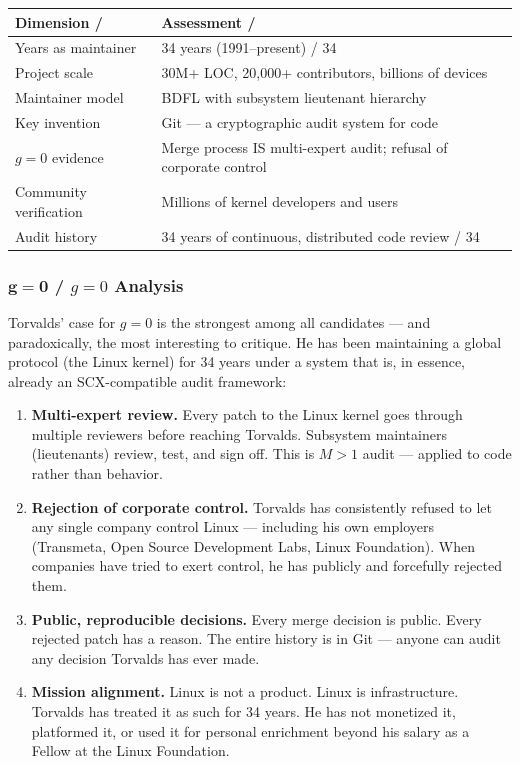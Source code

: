 \documentclass[12pt,a4paper]{article}
\theoremstyle{remark}
\begin{document}
\begin{center}
\begin{tabular}{p{} p{}}
\toprule
\textbf{Dimension / } & \textbf{Assessment / } \\
\midrule
Years as maintainer & 34 years (1991–present) / 34 \\
Project scale & 30M+ LOC, 20,000+ contributors, billions of devices \\
Maintainer model & BDFL with subsystem lieutenant hierarchy \\
Key invention & Git — a cryptographic audit system for code \\
$g=0$ evidence & Merge process IS multi-expert audit; refusal of corporate control \\
Community verification & Millions of kernel developers and users \\
Audit history & 34 years of continuous, distributed code review / 34 \\
\bottomrule
\end{tabular}
\end{center}

\subsubsection{$\mathbf{g=0}$  / $g=0$ Analysis}

Torvalds' case for $g=0$ is the strongest among all candidates — and
paradoxically, the most interesting to critique. He has been maintaining a
global protocol (the Linux kernel) for 34 years under a system that is, in
essence, already an SCX-compatible audit framework:

\begin{enumerate}[leftmargin=*]
    \item \textbf{Multi-expert review.} Every patch to the Linux kernel goes
          through multiple reviewers before reaching Torvalds. Subsystem
          maintainers (lieutenants) review, test, and sign off. This is
          $M > 1$ audit — applied to code rather than behavior.

    \item \textbf{Rejection of corporate control.} Torvalds has consistently
          refused to let any single company control Linux — including his
          own employers (Transmeta, Open Source Development Labs, Linux
          Foundation). When companies have tried to exert control, he has
          publicly and forcefully rejected them.

    \item \textbf{Public, reproducible decisions.} Every merge decision is
          public. Every rejected patch has a reason. The entire history is
          in Git — anyone can audit any decision Torvalds has ever made.

    \item \textbf{Mission alignment.} Linux is not a product. Linux is
          infrastructure. Torvalds has treated it as such for 34 years.
          He has not monetized it, platformed it, or used it for personal
          enrichment beyond his salary as a Fellow at the Linux Foundation.
\end{enumerate}
\end{document}

